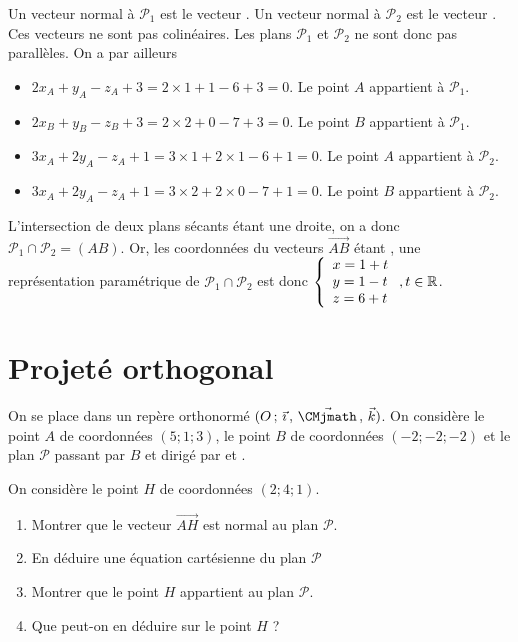 \documentclass[11pt,fleqn, openany]{book} %
\begin{document}
\begin{solution}Un vecteur normal à $\mathcal{P}_1$ est le vecteur . Un vecteur normal à $\mathcal{P}_2$ est le vecteur . Ces vecteurs ne sont pas colinéaires. Les plans $\mathcal{P}_1$ et $\mathcal{P}_2$ ne sont donc pas parallèles. On a par ailleurs

\begin{itemize}
\item $2x_A+y_A-z_A+3=2\times 1 + 1 -6 +3 =0$. Le point $A$ appartient à $\mathcal{P}_1$.
\item $2x_B+y_B-z_B+3=2\times 2 + 0 -7 +3 =0$. Le point $B$ appartient à $\mathcal{P}_1$.
\item $3x_A+2y_A-z_A+1=3\times 1 + 2 \times 1 - 6 + 1 =0$. Le point $A$ appartient à $\mathcal{P}_2$.
\item $3x_A+2y_A-z_A+1=3\times 2 + 2 \times 0 - 7 + 1 =0$. Le point $B$ appartient à $\mathcal{P}_2$.
\end{itemize} 

L'intersection de deux plans sécants étant une droite, on a donc $\mathcal{P}_1 \cap \mathcal{P}_2=(AB)$. Or, les coordonnées du vecteurs $\overrightarrow{AB}$ étant , une représentation paramétrique de $\mathcal{P}_1 \cap \mathcal{P}_2$ est donc $\left\{\renewcommand{\arraystretch}{1}\renewcommand{\arraystretch}{1}\begin{array}{l} x = 1 +t \\ y = 1-t \\ z = 6+t 
\end{array}\right. , t\in \mathbb{R}$.\end{solution}



\section*{Projeté orthogonal}

\begin{exercise}On se place dans un repère orthonormé $\Oijk$. On considère le point $A$ de coordonnées $(5;1;3)$, le point $B$ de coordonnées $(-2;-2;-2)$ et le plan $\mathcal{P}$ passant par $B$ et dirigé par  et .
\vspace{-0.5cm}

On considère le point $H$ de coordonnées $(2;4;1)$.
\begin{enumerate}
\item Montrer que le vecteur $\overrightarrow{AH}$ est normal au plan $\mathcal{P}$.
\item En déduire une équation cartésienne du plan $\mathcal{P}$
\item Montrer que le point $H$ appartient au plan $\mathcal{P}$. 
\item Que peut-on en déduire sur le point $H$ ?
\end{enumerate}\end{exercise}
\end{document}
